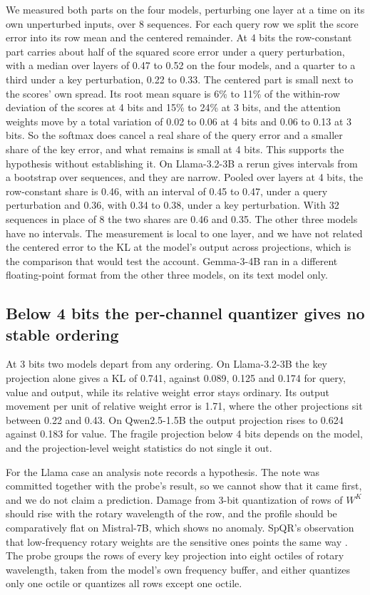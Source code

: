 \documentclass[10pt]{article}
\begin{document}
We measured both parts on the four models, perturbing one layer at a time on its own unperturbed
inputs, over 8 sequences. For each query row we split the score error into its row mean and the
centered remainder. At 4 bits the row-constant part carries about half of the squared score
error under a query perturbation, with a median over layers of 0.47 to 0.52 on the four models,
and a quarter to a third under a key perturbation, 0.22 to 0.33. The centered part is small next
to the scores' own spread. Its root mean square is 6\% to 11\% of the within-row deviation of the
scores at 4 bits and 15\% to 24\% at 3 bits, and the attention weights move by a total variation
of 0.02 to 0.06 at 4 bits and 0.06 to 0.13 at 3 bits. So the softmax does cancel a real share of
the query error and a smaller share of the key error, and what remains is small at 4 bits. This
supports the hypothesis without establishing it. On Llama-3.2-3B a rerun
gives intervals from a bootstrap over sequences, and they are narrow. Pooled over layers at 4
bits, the row-constant share is 0.46, with an interval of 0.45 to 0.47, under a query
perturbation and 0.36, with 0.34 to 0.38, under a key perturbation. With 32 sequences in place
of 8 the two shares are 0.46 and 0.35. The other three models have no intervals. The measurement
is local to one layer, and we have not related the centered error to the KL at the model's output across
projections, which is the comparison that would test the account. Gemma-3-4B ran in a different
floating-point format from the other three models, on its text model only.

\subsection{Below 4 bits the per-channel quantizer gives no stable ordering}\label{sec:proj:below4}

At 3 bits two models depart from any ordering. On Llama-3.2-3B the key projection alone gives a
KL of 0.741, against 0.089, 0.125 and 0.174 for query, value and output, while its relative
weight error stays ordinary. Its output movement per unit of relative weight error is 1.71, where
the other projections sit between 0.22 and 0.43. On Qwen2.5-1.5B the output projection rises to
0.624 against 0.183 for value. The fragile projection below 4 bits depends on the model, and the
projection-level weight statistics do not single it out.

For the Llama case an analysis note records a hypothesis. The note was committed together
with the probe's result, so we cannot show that it came first, and we do not claim a
prediction. Damage
from 3-bit quantization of rows of $W^K$ should rise with the rotary wavelength of the row, and
the profile should be comparatively flat on Mistral-7B, which shows no anomaly. SpQR's
observation that low-frequency rotary weights are the sensitive ones points the same way
\citep{dettmers2024spqr}. The probe groups the rows of every key projection into eight octiles
of rotary wavelength, taken from the model's own frequency buffer, and either quantizes only one
octile or quantizes all rows except one octile.
\end{document}
